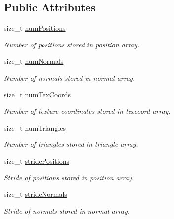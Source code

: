 \subsection*{Public Attributes}
\begin{DoxyCompactItemize}
\item 
size\_\-t \hyperlink{classembree_1_1_triangle_mesh_handle_a6349157b77e67cc255f623db20a40720}{numPositions}
\begin{DoxyCompactList}\small\item\em Number of positions stored in position array. \item\end{DoxyCompactList}\item 
size\_\-t \hyperlink{classembree_1_1_triangle_mesh_handle_aff1d5657fd1540c469f7b5c347b8de32}{numNormals}
\begin{DoxyCompactList}\small\item\em Number of normals stored in normal array. \item\end{DoxyCompactList}\item 
size\_\-t \hyperlink{classembree_1_1_triangle_mesh_handle_abfad906cd249332f6811fe00add43738}{numTexCoords}
\begin{DoxyCompactList}\small\item\em Number of texture coordinates stored in texcoord array. \item\end{DoxyCompactList}\item 
size\_\-t \hyperlink{classembree_1_1_triangle_mesh_handle_a6933547b0ae57a6a1661218cfe2050c1}{numTriangles}
\begin{DoxyCompactList}\small\item\em Number of triangles stored in triangle array. \item\end{DoxyCompactList}\item 
size\_\-t \hyperlink{classembree_1_1_triangle_mesh_handle_a9e2c086b3028155438d81dad7deab2c8}{stridePositions}
\begin{DoxyCompactList}\small\item\em Stride of positions stored in position array. \item\end{DoxyCompactList}\item 
size\_\-t \hyperlink{classembree_1_1_triangle_mesh_handle_a57f7f38b30a0fca87239967894d3bf07}{strideNormals}
\begin{DoxyCompactList}\small\item\em Stride of normals stored in normal array. \item\end{DoxyCompactList}\item 

\end{DoxyCompactItemize}
